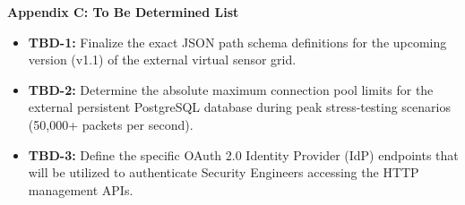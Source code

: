 \documentclass[12pt,letterpaper]{article}
\newcommand{\appendixheading}[1]{%
  \par\vspace{0.083in}%
  {\bfseries\fontsize{18}{20}\selectfont #1\par}%
  \vspace{0.167in}%
}
\begin{document}
\appendixheading{Appendix C: To Be Determined List}
\begin{itemize}
\item \textbf{TBD-1:} Finalize the exact JSON path schema definitions for the upcoming version (v1.1) of the external virtual sensor grid.
\item \textbf{TBD-2:} Determine the absolute maximum connection pool limits for the external persistent PostgreSQL database during peak stress-testing scenarios (50,000+ packets per second).
\item \textbf{TBD-3:} Define the specific OAuth 2.0 Identity Provider (IdP) endpoints that will be utilized to authenticate Security Engineers accessing the HTTP management APIs.
\end{itemize}
\end{document}
